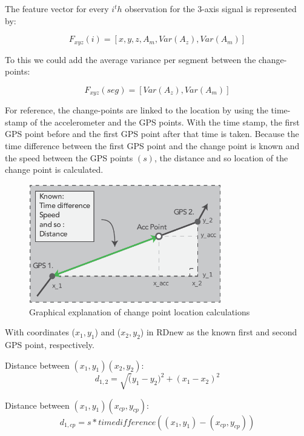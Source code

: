 The feature vector for every $i^th$  observation for the 3-axis signal is represented by:

\begin{equation}
F_{xyz}(i) = [ x, y, z, A_{m}, Var(A_{z}), Var(A_{m})]  %
\end{equation}

To this we could add the average variance per segment between the change-points:

\begin{equation}
F_{xyz}(seg) = [Var(A_{z}), Var(A_{m})]
\end{equation}

For reference, the change-points are linked to the location by using the time-stamp of the accelerometer and the GPS points. With the time stamp, the first GPS point before and the first GPS point after that time is taken. Because the time difference between the first GPS point and the change point is known and the speed between the GPS points $(s)$, the distance and so location of the change point is calculated. 

\begin{figure}[h]
\includegraphics[width=0.75\textwidth]{img/M_location_calc.pdf}
\centering
\caption{Graphical explanation of change point location calculations \label{cpcalc}}
\end{figure}

With coordinates ($x_{1}, y_{1}$) and  ($x_{2}, y_{2}$) in RDnew as the known first and second GPS point, respectively. 

Distance between $(x_{1}, y_{1})(x_{2}, y_{2})$:
\begin{equation}
d_{1,2} = \sqrt (y_{1}-y_{2})^2 + (x_{1}-x_{2})^2 
\end{equation}

Distance between $(x_{1}, y_{1})(x_{cp}, y_{cp})$:
\begin{equation}
d_{1,cp} = s * time difference((x_{1}, y_{1}) - (x_{cp}, y_{cp}))
\end{equation}


